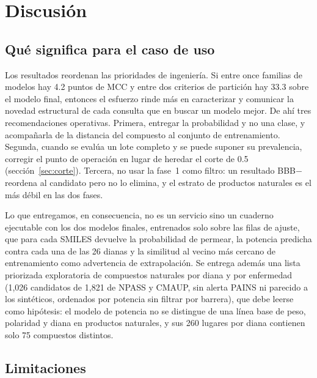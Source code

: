 \documentclass[twocolumn,10pt,letterpaper]{article}
\begin{document}
\section{Discusión}

\subsection{Qué significa para el caso de uso}

Los resultados reordenan las prioridades de ingeniería. Si entre once familias de modelos hay 4.2 puntos de MCC y entre dos criterios de partición hay 33.3 sobre el modelo final, entonces el esfuerzo rinde más en caracterizar y comunicar la novedad estructural de cada consulta que en buscar un modelo mejor. De ahí tres recomendaciones operativas. Primera, entregar la probabilidad y no una clase, y acompañarla de la distancia del compuesto al conjunto de entrenamiento. Segunda, cuando se evalúa un lote completo y se puede suponer su prevalencia, corregir el punto de operación en lugar de heredar el corte de 0.5 (sección~\ref{sec:corte}). Tercera, no usar la fase~1 como filtro: un resultado BBB$-$ reordena al candidato pero no lo elimina, y el estrato de productos naturales es el más débil en las dos fases.

Lo que entregamos, en consecuencia, no es un servicio sino un cuaderno ejecutable con los dos modelos finales, entrenados solo sobre las filas de ajuste, que para cada SMILES devuelve la probabilidad de permear, la potencia predicha contra cada una de las 26 dianas y la similitud al vecino más cercano de entrenamiento como advertencia de extrapolación. Se entrega además una lista priorizada exploratoria de compuestos naturales por diana y por enfermedad (1,026 candidatos de 1,821 de NPASS y CMAUP, sin alerta PAINS ni parecido a los sintéticos, ordenados por potencia sin filtrar por barrera), que debe leerse como hipótesis: el modelo de potencia no se distingue de una línea base de peso, polaridad y diana en productos naturales, y sus 260 lugares por diana contienen solo 75 compuestos distintos.

\subsection{Limitaciones}
\end{document}
